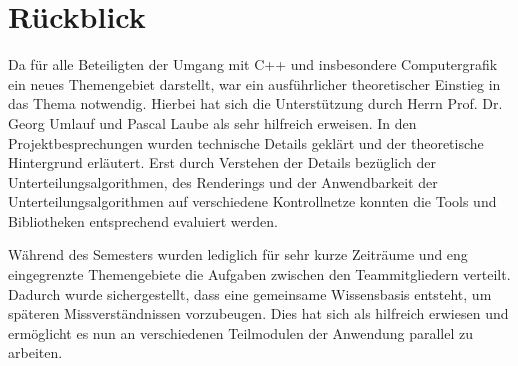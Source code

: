 \section{Rückblick}

Da für alle Beteiligten der Umgang mit C++ und insbesondere Computergrafik ein neues Themengebiet darstellt, war ein ausführlicher theoretischer Einstieg in das Thema notwendig. 
Hierbei hat sich die Unterstützung durch Herrn Prof. Dr. Georg Umlauf und Pascal Laube als sehr hilfreich erweisen.
In den Projektbesprechungen wurden technische Details geklärt und der theoretische Hintergrund erläutert.
Erst durch Verstehen der Details bezüglich der Unterteilungsalgorithmen, des Renderings und der Anwendbarkeit der Unterteilungsalgorithmen auf verschiedene Kontrollnetze konnten die Tools und Bibliotheken entsprechend evaluiert werden.

Während des Semesters wurden lediglich für sehr kurze Zeiträume und eng eingegrenzte Themengebiete die Aufgaben zwischen den Teammitgliedern verteilt.
Dadurch wurde sichergestellt, dass eine gemeinsame Wissensbasis entsteht, um späteren Missverständnissen vorzubeugen.
Dies hat sich als hilfreich erwiesen und ermöglicht es nun an verschiedenen Teilmodulen der Anwendung parallel zu arbeiten.

